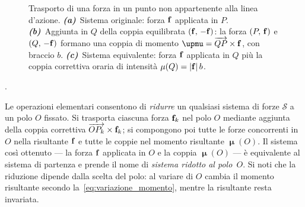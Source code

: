 \begin{oss}
\begin{figure}[htbp]
{}
		\qquad
		\caption{Trasporto di una forza in un punto non appartenente
			alla linea d'azione.
			\textbf{\textit{(a)}}~Sistema originale: forza $\mathbf{f}$
			applicata in $P$.
			\textbf{\textit{(b)}}~Aggiunta in $Q$ della coppia
			equilibrata $(\mathbf{f},\,-\mathbf{f})$: la forza $(P,\,\mathbf{f})$ e
			$(Q,\,-\mathbf{f})$ formano una coppia di momento
			$\bm{\upmu} = \protect\overrightarrow{QP}\times\fb$,
			con braccio $b$.
			\textbf{\textit{(c)}}~Sistema equivalente: forza $\mathbf{f}$
			applicata in $Q$ più la coppia correttiva oraria di intensità 
			$\mu(Q) = |\mathbf{f}|\,b$.}
		\label{fig:trasporto_forza}
	\end{figure}.
\end{oss}

\begin{oss}
	Le operazioni elementari consentono di \textit{ridurre} un
	qualsiasi sistema di forze $\mathcal{S}$ a un polo $O$
	fissato. Si trasporta ciascuna forza $\mathbf{f}_k$ nel polo $O$
	mediante aggiunta della coppia correttiva
	$\overrightarrow{OP_k}\times\mathbf{f}_k$; si compongono poi tutte
	le forze concorrenti in $O$ nella risultante $\mathbf{f}$ e tutte
	le coppie nel momento risultante $\bm{\upmu}(O)$. Il sistema
	così ottenuto --- la forza $\mathbf{f}$ applicata in $O$ e la
	coppia $\bm{\upmu}(O)$ --- è equivalente al sistema di
	partenza e prende il nome di \textit{sistema ridotto al
		polo~$O$}. Si noti che la riduzione dipende dalla scelta
	del polo: al variare di $O$ cambia il momento risultante
	secondo la~\eqref{eq:variazione_momento}, mentre la
	risultante resta invariata.
\end{oss}



